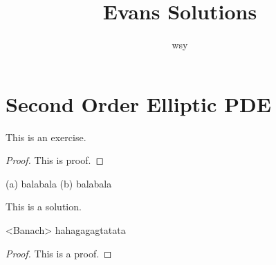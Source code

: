 \documentclass[]{mathexercise}
\title{Evans Solutions}
\author{wsy}
\begin{document}
\maketitle
  
\chapter{Second Order Elliptic PDE}

\begin{exercise}
  This is an exercise.
\end{exercise}

\begin{proof}
  This is proof.
\end{proof}

\begin{exercise}
  (a) balabala
  (b) balabala
\end{exercise}

\begin{solution}
  This is a solution.
\end{solution}

\begin{exercise}[4]<Banach>
  hahagagagtatata
\end{exercise}

\begin{proof}
  This is a proof.
\end{proof}
\end{document}
